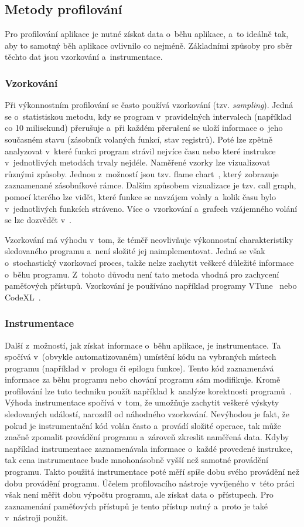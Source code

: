 \subsection{Metody profilování}
Pro profilování aplikace je nutné získat data o~běhu aplikace, a~to ideálně tak, aby to samotný běh aplikace ovlivnilo co nejméně. Základními způsoby pro sběr těchto dat jsou vzorkování a~instrumentace.

\subsubsection{Vzorkování}
Při výkonnostním profilování se často používá vzorkování (tzv. \emph{sampling}). Jedná se o~statistiskou metodu, kdy se program v~pravidelných intervalech (například co 10 milisekund) přerušuje a~při každém přerušení se uloží informace o~jeho současném stavu (zásobník volaných funkcí, stav registrů). Poté lze zpětně analyzovat v~které funkci program strávil nejvíce času nebo které instrukce v~jednotlivých metodách trvaly nejdéle. Naměřené vzorky lze vizualizovat různými způsoby. Jednou z~možností jsou tzv. flame chart~\cite{flamegraph}, který zobrazuje zaznamenané zásobníkové rámce. Dalším způsobem vizualizace je tzv. call graph, pomocí kterého lze vidět, které funkce se navzájem volaly a~kolik času bylo v~jednotlivých funkcích stráveno. Více o~vzorkování a~grafech vzájemného volání se lze dozvědět v~\cite{gprof}.

Vzorkování má výhodu v~tom, že téměř neovlivňuje výkonnostní charakteristiky sledovaného programu a~není složité jej naimplementovat. Jedná se však o~stochastický vzorkovací proces, takže nelze zachytit veškeré důležité informace o~běhu programu. Z~tohoto důvodu není tato metoda vhodná pro zachycení paměťových přístupů. Vzorkování je používáno například programy VTune~\cite{vtune} nebo CodeXL~\cite{codexl}.

\subsubsection{Instrumentace}
Další z~možností, jak získat informace o~běhu aplikace, je instrumentace. Ta spočívá v~(obvykle automatizovaném) umístění kódu na vybraných místech programu (například v~prologu či epilogu funkce). Tento kód zaznamenává informace za běhu programu nebo chování programu sám modifikuje. Kromě profilování lze tuto techniku použít například k~analýze korektnosti programů~\cite{memcheck}. Výhoda instrumentace spočívá v~tom, že umožňuje zachytit veškeré výskyty sledovaných událostí, narozdíl od náhodného vzorkování. Nevýhodou je fakt, že pokud je instrumentační kód volán často a~provádí složité operace, tak může značně zpomalit provádění programu a~zároveň zkreslit naměřená data. Kdyby například instrumentace zaznamenávala informace o~každé provedené instrukce, tak cena instrumentace bude mnohonásobně vyšší než samotné provádění programu. Takto použitá instrumentace poté měří spíše dobu svého provádění než dobu provádění programu. Účelem profilovacího nástroje vyvíjeného v~této práci však není měřit dobu výpočtu programu, ale získat data o~přístupech. Pro zaznamenání paměťových přístupů je tento přístup nutný a~proto je také v~nástroji použit.

